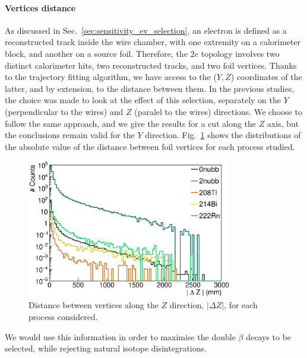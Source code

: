\paragraph{Vertices distance}
As discussed in Sec.~\ref{sec:sensitivity_ev_selection}, an electron is defined as a reconstructed track inside the wire chamber, with one extremity on a calorimeter block, and another on a source foil.
Therefore, the $2e$ topology involves two distinct calorimeter hits, two reconstructed tracks, and two foil vertices.
Thanks to the trajectory fitting algorithm, we have access to the ($Y,Z$) coordinates of the latter, and by extension, to the distance between them.
In the previous studies, the choice was made to look at the effect of this selection, separately on the $Y$ (perpendicular to the wires) and $Z$ (paralel to the wires) directions.
We choose to follow the same approach, and we give the results for a cut along the $Z$ axis, but the conclusions remain valid for the $Y$ direction.
Fig.~\ref{fig:vertex_dist} shows the distributions of the absolute value of the distance between foil vertices for each process studied.
\begin{figure}[h]
  \centering
  \includegraphics[width=0.8\textwidth]{Sensitivity/fig_sensitivity/Vertex_distance.eps}
  \caption{Distance between vertices along the $Z$ direction, $|\Delta Z|$, for each process considered.
    \label{fig:vertex_dist}}
\end{figure}
We would use this information in order to maximise the double $\beta$ decays to be selected, while rejecting natural isotope disintegrations.

